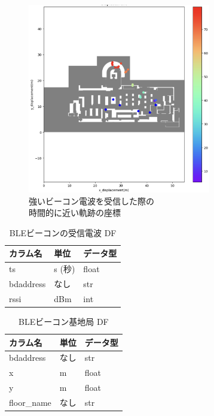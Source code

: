 \begin{figure}[ht]
	\centering
	\includegraphics[width=80mm]{image/ble-merge.jpg}
	\caption{強いビーコン電波を受信した際の\\時間的に近い軌跡の座標}    \label{fig:ble-merge}
\end{figure}

\begin{table}[ht]
  \caption{BLEビーコンの受信電波 DF}
	\centering
	\begin{tabular}{lll}
		\toprule
		カラム名      & 単位    & データ型  \\
		\midrule
		ts        & s (秒) & float \\
		bdaddress & なし    & str   \\
		rssi      & dBm   & int   \\
		\bottomrule
	\end{tabular}
\end{table}

\begin{table}[ht]
	\caption{BLEビーコン基地局 DF}
	\centering
	\begin{tabular}{lll}
		\toprule
		カラム名        & 単位 & データ型  \\
		\midrule
		bdaddress   & なし & str   \\
		x           & m  & float \\
		y           & m  & float \\
		floor\_name & なし & str   \\
		\bottomrule
	\end{tabular}
\end{table}
